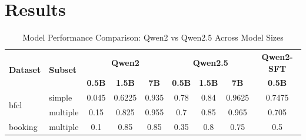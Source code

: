 \documentclass[12pt]{extarticle}
\begin{document}
\section{Results}

\begin{table}[h]
\centering
\caption{Model Performance Comparison: Qwen2 vs Qwen2.5 Across Model Sizes}
\begin{tabular}{|l|l|c|c|c|c|c|c|c|}
\hline
\multirow{2}{*}{\textbf{Dataset}} & \multirow{2}{*}{\textbf{Subset}} & \multicolumn{3}{c|}{\textbf{Qwen2}} & \multicolumn{3}{c|}{\textbf{Qwen2.5}} & \textbf{Qwen2-SFT} \\
\cline{3-8}
 &  & \textbf{0.5B} & \textbf{1.5B} & \textbf{7B} & \textbf{0.5B} & \textbf{1.5B} & \textbf{7B} & \textbf{0.5B} \\
\hline
\multirow{2}{*}{bfcl} & simple & 0.045 & 0.6225 & 0.935 & 0.78 & 0.84 & 0.9625 & 0.7475 \\
\cline{2-9}
 & multiple & 0.15 & 0.825 & 0.955 & 0.7 & 0.85 & 0.965 & 0.705 \\
\hline
booking & multiple & 0.1 & 0.85 & 0.85 & 0.35 & 0.8 & 0.75 & 0.5 \\
\hline
\end{tabular}
\label{tab:model_performance}
\end{table}
\end{document}
